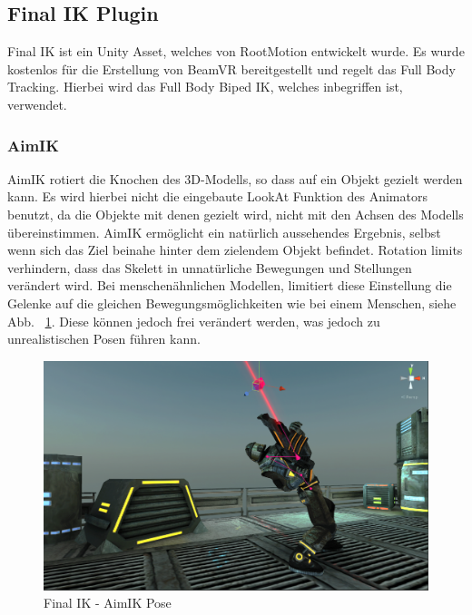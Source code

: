 \begin{itemize}





\subsection{Final IK Plugin}
Final IK ist ein Unity Asset, welches von RootMotion entwickelt wurde.
Es wurde kostenlos für die Erstellung von BeamVR bereitgestellt und regelt das Full Body Tracking.
Hierbei wird das Full Body Biped IK, welches inbegriffen ist, verwendet.
~\cite{FinalIK_Overview_2020}

\subsubsection{AimIK}
AimIK rotiert die Knochen des 3D-Modells, so dass auf ein Objekt gezielt werden kann.
Es wird hierbei nicht die eingebaute LookAt Funktion des Animators benutzt, da die Objekte mit denen gezielt wird, nicht mit den Achsen des Modells übereinstimmen.
AimIK ermöglicht ein natürlich aussehendes Ergebnis, selbst wenn sich das Ziel beinahe hinter dem zielendem Objekt befindet.
Rotation limits verhindern, dass das Skelett in unnatürliche Bewegungen und Stellungen verändert wird.
Bei menschenähnlichen Modellen, limitiert diese Einstellung die Gelenke auf die gleichen Bewegungsmöglichkeiten wie bei einem Menschen, siehe Abb. ~\ref{fig:finalIK_aimIK_pose}.
Diese können jedoch frei verändert werden, was jedoch zu unrealistischen Posen führen kann.
\begin {figure}
    \centering
    \includegraphics[scale=0.4]{pics/finalik_aimik_pose}
    \caption{Final IK - AimIK Pose}
    \label{fig:finalIK_aimIK_pose}
\end {figure}


\end{itemize}
